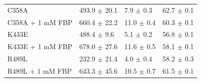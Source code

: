 \begin{table}[hbt]
\begin{tabular}{@{}llll@{}}
C358A   					&  493.9  $\pm$ 20.1        &         7.9 $\pm$ 0.3                 &      62.7 $\pm$ 0.1        \\
C358A + 1 mM FBP &  660.4  $\pm$ 22.2        &         11.0 $\pm$ 0.4                 &      60.3 $\pm$ 0.1        \\ \midrule
K433E  						&  488.4  $\pm$ 9.6         &         5.1 $\pm$ 0.2                 &      56.8 $\pm$ 0.1        \\ 
K433E + 1 mM FBP	&  678.0  $\pm$ 27.6         &         11.6 $\pm$ 0.5                &      58.1 $\pm$ 0.1        \\ \midrule
R489L  						&  232.9  $\pm$ 21.4         &         4.0 $\pm$ 0.4                 &      58.2 $\pm$ 0.3        \\
R489L + 1 mM FBP  &  643.3  $\pm$ 45.6         &         10.5 $\pm$ 0.7                 &      61.5 $\pm$ 0.1        \\ \bottomrule
\end{tabular}
\end{table}
%
%
%
%
%
%
